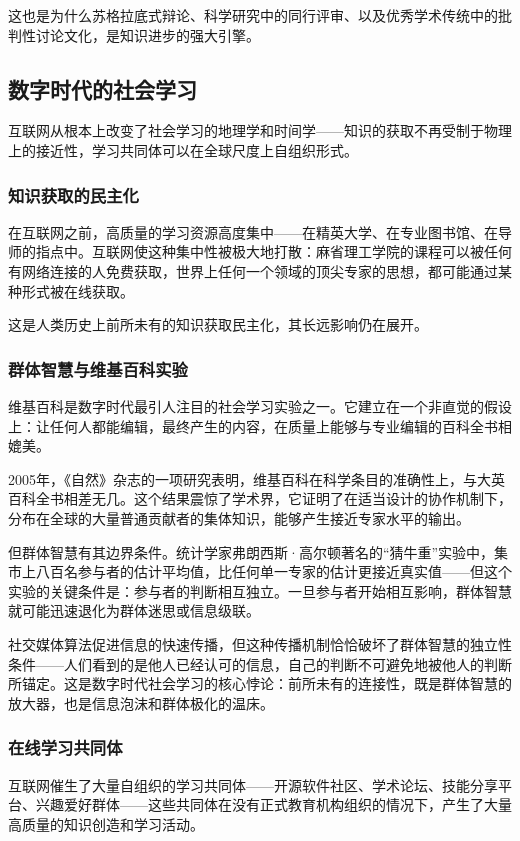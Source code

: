 \documentclass[11pt]{article}
\begin{document}
这也是为什么苏格拉底式辩论、科学研究中的同行评审、以及优秀学术传统中的批判性讨论文化，是知识进步的强大引擎。
\subsection{数字时代的社会学习}
\label{sec:org10558a1}

互联网从根本上改变了社会学习的地理学和时间学——知识的获取不再受制于物理上的接近性，学习共同体可以在全球尺度上自组织形式。
\subsubsection{知识获取的民主化}
\label{sec:orgf1d8653}

在互联网之前，高质量的学习资源高度集中——在精英大学、在专业图书馆、在导师的指点中。互联网使这种集中性被极大地打散：麻省理工学院的课程可以被任何有网络连接的人免费获取，世界上任何一个领域的顶尖专家的思想，都可能通过某种形式被在线获取。

这是人类历史上前所未有的知识获取民主化，其长远影响仍在展开。
\subsubsection{群体智慧与维基百科实验}
\label{sec:org55a1a7a}

维基百科是数字时代最引人注目的社会学习实验之一。它建立在一个非直觉的假设上：让任何人都能编辑，最终产生的内容，在质量上能够与专业编辑的百科全书相媲美。

2005年，《自然》杂志的一项研究表明，维基百科在科学条目的准确性上，与大英百科全书相差无几。这个结果震惊了学术界，它证明了在适当设计的协作机制下，分布在全球的大量普通贡献者的集体知识，能够产生接近专家水平的输出。

但群体智慧有其边界条件。统计学家弗朗西斯·高尔顿著名的“猜牛重”实验中，集市上八百名参与者的估计平均值，比任何单一专家的估计更接近真实值——但这个实验的关键条件是：参与者的判断相互独立。一旦参与者开始相互影响，群体智慧就可能迅速退化为群体迷思或信息级联。

社交媒体算法促进信息的快速传播，但这种传播机制恰恰破坏了群体智慧的独立性条件——人们看到的是他人已经认可的信息，自己的判断不可避免地被他人的判断所锚定。这是数字时代社会学习的核心悖论：前所未有的连接性，既是群体智慧的放大器，也是信息泡沫和群体极化的温床。
\subsubsection{在线学习共同体}
\label{sec:org3dd4ac4}

互联网催生了大量自组织的学习共同体——开源软件社区、学术论坛、技能分享平台、兴趣爱好群体——这些共同体在没有正式教育机构组织的情况下，产生了大量高质量的知识创造和学习活动。
\end{document}
